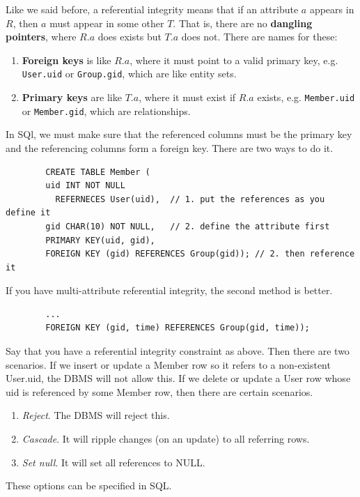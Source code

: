\documentclass{article}
\begin{document}
    \begin{definition}
      Like we said before, a referential integrity means that if an attribute $a$ appears in $R$, then $a$ must appear in some other $T$. That is, there are no \textbf{dangling pointers}, where $R.a$ does exists but $T.a$ does not. There are names for these: 
      \begin{enumerate}
        \item \textbf{Foreign keys} is like $R.a$, where it must point to a valid primary key, e.g. \texttt{User.uid} or \texttt{Group.gid}, which are like entity sets. 
        \item \textbf{Primary keys} are like $T.a$, where it must exist if $R.a$ exists, e.g. \texttt{Member.uid} or \texttt{Member.gid}, which are relationships. 
      \end{enumerate}
      In SQl, we must make sure that the referenced columns must be the primary key and the referencing columns form a foreign key. There are two ways to do it. 
      \begin{lstlisting}
        CREATE TABLE Member (
        uid INT NOT NULL 
          REFERNECES User(uid),  // 1. put the references as you define it
        gid CHAR(10) NOT NULL,   // 2. define the attribute first
        PRIMARY KEY(uid, gid), 
        FOREIGN KEY (gid) REFERENCES Group(gid)); // 2. then reference it
      \end{lstlisting}
      If you have multi-attribute referential integrity, the second method is better. 
      \begin{lstlisting}
        ...
        FOREIGN KEY (gid, time) REFERENCES Group(gid, time)); 
      \end{lstlisting}
    \end{definition}

    \begin{example}
      Say that you have a referential integrity constraint as above. Then there are two scenarios. If we insert or update a Member row so it refers to a non-existent User.uid, the DBMS will not allow this. If we delete or update a User row whose uid is referenced by some Member row, then there are certain scenarios. 
      \begin{enumerate}
        \item \textit{Reject}. The DBMS will reject this. 
        \item \textit{Cascade}. It will ripple changes (on an update) to all referring rows. 
        \item \textit{Set null}. It will set all references to NULL. 
      \end{enumerate}
      These options can be specified in SQL. 
    \end{example}
\end{document}
